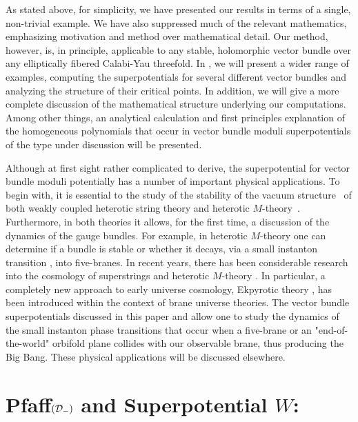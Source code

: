 \documentclass[a4paper,12pt]{article}
\numberwithin{equation}{section}
\theoremstyle{plain}
\begin{document}
As stated above, for simplicity, we have presented our results in terms of
a
single, non-trivial example. We have also suppressed much of the relevant
mathematics, emphasizing motivation and method over mathematical detail.
Our method, however, is, in principle,
applicable to any stable, holomorphic vector bundle
over
any elliptically fibered Calabi-Yau threefold.
In \cite{BDOnew}, we will present a wider
range of examples, computing the superpotentials for several different
vector
bundles and analyzing the structure of their critical points. In addition,
we
will
give a more complete discussion of the mathematical structure underlying
our
computations. Among other things, an analytical calculation
and first principles explanation of the homogeneous polynomials that occur
in vector bundle moduli superpotentials of the
type under discussion will be presented.

Although at first sight rather complicated to derive,
the superpotential for vector
bundle
moduli potentially has a number of important physical applications. To
begin
with, it is essential to the study of the stability of the vacuum
structure~\cite{CK,MPS} of
both weakly coupled heterotic string theory and
heterotic $M$-theory~\cite{hmt1,hmt2,hmt3}.
Furthermore, in both theories it allows, for the first time, a discussion
of
the dynamics of the gauge bundles. For example, in heterotic $M$-theory
one
can determine if a bundle is stable or whether it decays, via a small
instanton transition \cite{Pantev}, into five-branes.
In recent years, there has been
considerable research into the cosmology of superstrings and heterotic
$M$-theory \cite{low4, hos, blo} .
In particular, a completely new approach to early universe
cosmology, Ekpyrotic theory \cite{ekp1,ekp2,ekp3,ekp4,ekp5},
has been introduced within the context of
brane universe theories. The vector bundle superpotentials discussed in
this
paper and \cite{BDOnew} allow one to study the dynamics of the small
instanton phase
transitions that occur when a five-brane \cite{ekp1,ekp2} or
an "end-of-the-world" orbifold
plane \cite{ekp3,ekp4,ekp5} collides with our observable brane,
thus producing the Big Bang. These physical applications will be discussed
elsewhere.




\section{Pfaff$({\cal{D}}_{-})$ and Superpotential $W$:}
\end{document}
